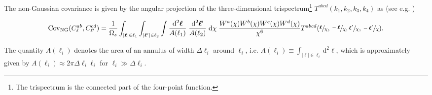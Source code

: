 \documentclass[%
 reprint,
nofootinbib,
 amsmath,amssymb,
 aps,
]{revtex4-1}
\begin{document}
The non-Gaussian covariance is given by the angular projection of the three-dimensional trispectrum\footnote{The trispectrum is the connected part of the four-point function.} $T^{abcd}(k_{1}, k_{2}, k_{3}, k_{4})$ as (see e.g. \cite{Krause:2017})
\begin{widetext}
\begin{equation}
\mathrm{Cov}_{\mathrm{NG}}(C^{ab}_{\ell}, C^{cd}_{\ell'}) = \frac{1}{\Omega_{s}} \int_{\vert \boldsymbol{\ell} \vert \in \ell_{1}} \int_{\vert \boldsymbol{\ell}' \vert \in \ell_{2}} \int \frac{\mathrm{d}^{2}\boldsymbol{\ell}}{A(\ell_{1})} \; \frac{\mathrm{d}^{2}\boldsymbol{\ell}'}{A(\ell_{2})} \; \mathrm{d}\chi \; \frac{W^{a}(\chi)W^{b}(\chi)W^{c}(\chi)W^{d}(\chi)}{\chi^{6}} T^{abcd}(\sfrac{\boldsymbol{\ell}}{\chi}, \sfrac{-\boldsymbol{\ell}}{\chi}, \sfrac{\boldsymbol{\ell}'}{\chi}, \sfrac{-\boldsymbol{\ell}'}{\chi}).
\end{equation}
\end{widetext}
The quantity $A(\ell_{i})$ denotes the area of an annulus of width $\Delta \ell_{i}$ around $\ell_{i}$, i.e. $A(\ell_{i}) \equiv \int_{\vert \boldsymbol{\ell} \vert \in \ell_{i}} \mathrm{d}^{2}\boldsymbol{\ell}$, which is approximately given by $A(\ell_{i}) \approx 2 \pi \Delta \ell_{i} \ell_{i}$ for $\ell_{i} \gg \Delta \ell_{i}$.
    
\end{document}

